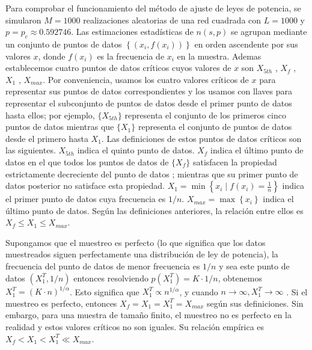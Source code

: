 Para comprobar el funcionamiento del método de ajuste de leyes de potencia, se simularon $M=1000$ realizaciones  aleatorias de    una red cuadrada con  $L=1000$ y $p=p_c\approx0.592746$. Las estimaciones estadísticas de $n(s, p)$  
se agrupan mediante un conjunto de puntos de datos $\left\{\left(x_i,f(x_i)\right)\right\}$ en orden ascendente por sus valores $x$, donde $f(x_i)$ es la frecuencia de $x_i$ en la muestra. Ademas establecemos cuatro puntos de datos críticos cuyos valores de $x$ son $X_{5th}$ , $X_f$ , $X_1$ , $X_{max}$.  Por conveniencia, usamos los cuatro valores críticos de $x$ para representar sus puntos de datos correspondientes y los usamos con llaves para representar el subconjunto de puntos de datos desde el primer punto de datos hasta ellos; por ejemplo, $\{ X_{5th}\}$ representa el conjunto de los primeros cinco puntos de datos mientras que $\{ X_1 \}$ representa el conjunto de puntos de datos desde el primero hasta $X_1$. Las definiciones de estos puntos de datos críticos son las siguientes. $X_{5th}$ indica el quinto punto de datos. $X_f$ indica el último punto de datos en el que todos los puntos de datos de $\{ X_f \}$ satisfacen la propiedad  estrictamente decreciente del punto de datos ; mientras que su primer punto de datos posterior no satisface  esta  propiedad. $X_1=\min\left\{x_i\mid f(x_i)=\frac{1}{n}\right\}$ indica el primer punto de datos cuya frecuencia es $1/n$. $X_{max} = \max\left\{x_i\right\}$ indica el último punto de datos. Según las definiciones anteriores, la relación entre ellos es $X_f \leq  X_1 \leq X_{max}$.


Supongamos que el muestreo es perfecto (lo que significa que los datos muestreados siguen perfectamente una distribución de ley de potencia), la frecuencia del punto de datos de menor frecuencia es $1/n$ y sea este punto de datos $(X^T_1,1/n)$ entonces resolviendo $p(X^T_1)=K\cdot1/n$, obtenemos $X^T_1=(K\cdot n)^{1/\alpha}$. Esto significa que $X^T_1\propto n^{1/\alpha}$, y cuando $n \to\infty, X^T_1\to\infty$ \cite{zhong_is_2022}. Si el muestreo es perfecto, entonces $X_f=X_1=X^T_1=X_{max}$ según sus definiciones. Sin embargo, para una muestra de tamaño finito, el muestreo no es perfecto en la realidad y estos valores críticos no son iguales. Su relación empírica es $X_f<X_1<X^T_1\ll X_{max}$.




